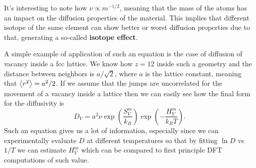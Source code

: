 \nt
{
    It's interesting to note how $\nu \propto m^{-1/2}$, meaning that the mass of the atoms has an impact on the diffusion properties of the material. This implies that different isotope of the same element can show better or worst diffusion properties due to that, generating a so-called \textbf{isotope effect}. 
}

{
    A simple example of application of such an equation is the case of diffusion of vacancy inside a fcc lattice. We know how $z = 12$ inside such a geometry and the distance between neighbors is $a/\sqrt{2}$, where $a$ is the lattice constant, meaning that $\left\langle r^2 \right\rangle = a^2/2$. If we assume that the jumps are uncorrelated for the movement of a vacancy inside a lattice then we can easily see how the final form for the diffusivity is
    \begin{equation}
        D_V = a^2 \nu \exp\left( \frac{S^m_V}{k_B} \right)\exp\left( -\frac{H^m_V}{k_BT} \right).
    \end{equation}
    Such an equation gives us a lot of information, especially since we can experimentally evaluate $D$ at different temperatures so that by fitting $\ln D$ vs $1/T$ we can estimate $H^m_V$ which can be compared to first principle DFT computations of such value.
}